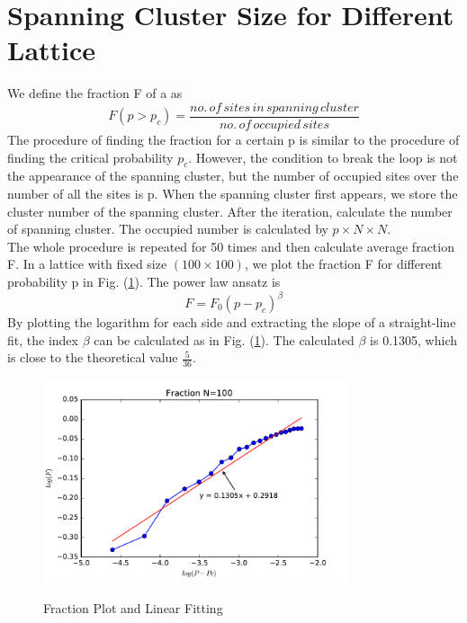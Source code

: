 \documentclass[12pt]{article}
\begin{document}
\section{Spanning Cluster Size for Different Lattice}
We define the fraction F of a as
$$F\left(p>p_c\right)=\frac{no.\,of\,sites\,in\,spanning\,cluster}{no.\,of\,occupied\,sites}$$
The procedure of finding the fraction for a certain p is similar to the procedure of finding the critical probability $p_c$. However, the condition to break the loop is not the appearance of the spanning cluster, but the number of occupied sites over the number of all the sites is p. When the spanning cluster first appears, we store the cluster number of the spanning cluster. After the iteration, calculate the number of spanning cluster. The occupied number is calculated by $p\times N\times N$. \\
The whole procedure is repeated for 50 times and then calculate average fraction F. In a lattice with fixed size $(100\times100)$, we plot the fraction F for different probability p in Fig. (\ref{Fraction}). The power law ansatz is 
$$F=F_0\left(p-p_c\right)^\beta$$
By plotting the logarithm for each side and extracting the slope of a straight-line fit, the index $\beta$ can be calculated as in Fig. (\ref{Fraction}). The calculated $\beta$ is 0.1305, which is close to the theoretical value $\frac{5}{36}$. 
\begin{figure}[H]
\centering
  \includegraphics[width=0.8\textwidth]{fraction_all.pdf}
  \label{Fraction}
  \caption{Fraction Plot and Linear Fitting}
\end{figure}
\end{document}
